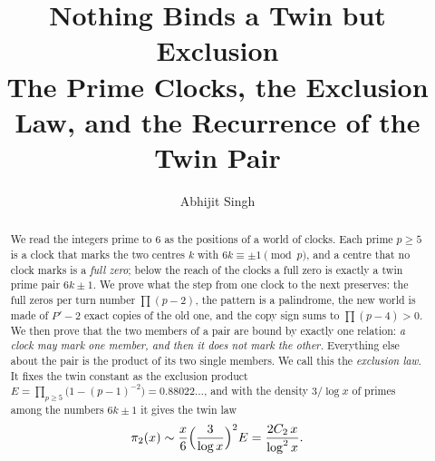 \documentclass[11pt]{article}
\title{\textbf{Nothing Binds a Twin but Exclusion}\\[6pt]
\large The Prime Clocks, the Exclusion Law, and the Recurrence of the Twin Pair}
\author{Abhijit Singh}
\date{}
\theoremstyle{definition}\newtheorem{definition}[theorem]{Definition}
\theoremstyle{remark}\newtheorem{remark}[theorem]{Remark}
\begin{document}
\maketitle

\begin{abstract}
We read the integers prime to $6$ as the positions of a world of clocks. Each prime $p\ge5$ is a clock that marks the two centres $k$ with $6k\equiv\pm1\pmod p$, and a centre that no clock marks is a \emph{full zero}; below the reach of the clocks a full zero is exactly a twin prime pair $6k\pm1$. We prove what the step from one clock to the next preserves: the full zeros per turn number $\prod(p-2)$, the pattern is a palindrome, the new world is made of $P'-2$ exact copies of the old one, and the copy sign sums to $\prod(p-4)>0$. We then prove that the two members of a pair are bound by exactly one relation: \emph{a clock may mark one member, and then it does not mark the other.} Everything else about the pair is the product of its two single members. We call this the \emph{exclusion law}. It fixes the twin constant as the exclusion product $E=\prod_{p\ge5}\bigl(1-(p-1)^{-2}\bigr)=0.88022\ldots$, and with the density $3/\log x$ of primes among the numbers $6k\pm1$ it gives the twin law
\[
\pi_2(x)\sim\frac x6\Bigl(\frac3{\log x}\Bigr)^{2}E=\frac{2C_2\,x}{\log^2x}.
\]

\end{abstract}
\end{document}
